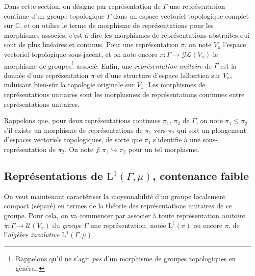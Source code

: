 \documentclass[a4paper,12pt]{article}
\newcommand{\C}{\mathbb{C}}
\begin{document}
Dans cette section, on désigne par \og{}représentation de $\Gamma$\fg{} une représentation continue d'un
groupe topologique $\Gamma$ dans un espace vectoriel topologique complet sur $\C$, et on utilise le terme de \og{}morphisme 
de représentations\fg{} pour les morphismes associés, c'est à dire les morphismes de représentations abstraites
qui sont de plus linéaires et continus. Pour une représentation $\pi$, on note $V_\pi$ l'espace 
vectoriel topologique sous-jacent, et on note encore $\pi : \Gamma\to\mathcal{GL}(V_\pi)$ le morphisme 
de groupes\footnote{Rappelons qu'il ne s'agit \emph{pas} d'un morphisme de groupes topologiques en général.} associé.
Enfin, une \emph{représentation unitaire} de $\Gamma$ est la donnée d'une représentation $\pi$ et d'une structure 
d'espace hilbertien sur $V_\pi$, induisant bien-sûr la topologie originale sur $V_\pi$. Les morphismes de représentations 
unitaires sont les morphismes de représentations continues entre représentations unitaires.

Rappelons que, pour deux représentations continues $\pi_1$, $\pi_2$ de $\Gamma$, on note 
$\pi_1\le\pi_2$ s'il existe un morphisme de représentations de $\pi_1$ vers $\pi_2$ qui soit un plongement
d'espaces vectoriels topologiques, de sorte que $\pi_1$ s'identifie à une sous-représentation de $\pi_2$.
On note $f : \pi_1\hookrightarrow\pi_2$ pour un tel morphisme.

\subsection{Représentations de \texorpdfstring{$\mathrm{L}^1(\Gamma, \mu)$}{l'algèbre des fonctions intégrables}, contenance faible}

On veut maintenant caractériser la moyennabilité d'un groupe localement compact (séparé) en termes
de la théorie des représentations unitaires de ce groupe. Pour cela, on va commencer par associer à toute représentation 
\emph{unitaire} $\pi : \Gamma\to\mathcal{U}(V_\pi)$ du \emph{groupe} $\Gamma$ une
représentation, notée $\mathrm{L}^1(\pi)$ ou encore $\pi$, de l'\emph{algèbre involutive} $\mathrm{L}^1(\Gamma, \mu)$.

\end{document}
